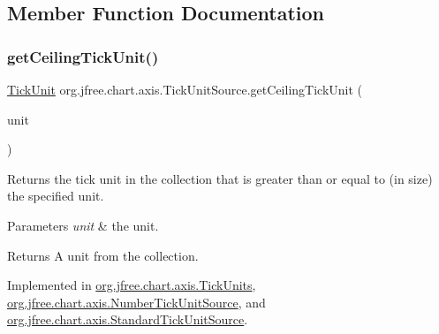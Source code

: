 \subsection{Member Function Documentation}
\mbox{\label{interfaceorg_1_1jfree_1_1chart_1_1axis_1_1_tick_unit_source_a38db8c401c916244f48a758a8e8d469f}} 
\subsubsection{\texorpdfstring{get\+Ceiling\+Tick\+Unit()}{getCeilingTickUnit()}\hspace{0.1cm}{\footnotesize\ttfamily [1/2]}}
{\footnotesize\ttfamily \mbox{\hyperlink{classorg_1_1jfree_1_1chart_1_1axis_1_1_tick_unit}{Tick\+Unit}} org.\+jfree.\+chart.\+axis.\+Tick\+Unit\+Source.\+get\+Ceiling\+Tick\+Unit (\begin{DoxyParamCaption}\item[{\mbox{\hyperlink{classorg_1_1jfree_1_1chart_1_1axis_1_1_tick_unit}{Tick\+Unit}}}]{unit }\end{DoxyParamCaption})}

Returns the tick unit in the collection that is greater than or equal to (in size) the specified unit.


\begin{DoxyParams}{Parameters}
{\em unit} & the unit.\\
\hline
\end{DoxyParams}
\begin{DoxyReturn}{Returns}
A unit from the collection. 
\end{DoxyReturn}


Implemented in \mbox{\hyperlink{classorg_1_1jfree_1_1chart_1_1axis_1_1_tick_units_a925a94d152ae23f36f676bd9a0dee5e3}{org.\+jfree.\+chart.\+axis.\+Tick\+Units}}, \mbox{\hyperlink{classorg_1_1jfree_1_1chart_1_1axis_1_1_number_tick_unit_source_a8f94f7cddfff2ddf4d57b4e0abe11a12}{org.\+jfree.\+chart.\+axis.\+Number\+Tick\+Unit\+Source}}, and \mbox{\hyperlink{classorg_1_1jfree_1_1chart_1_1axis_1_1_standard_tick_unit_source_a3b8cc0c89ecd3bf00acbd1368a571190}{org.\+jfree.\+chart.\+axis.\+Standard\+Tick\+Unit\+Source}}.

